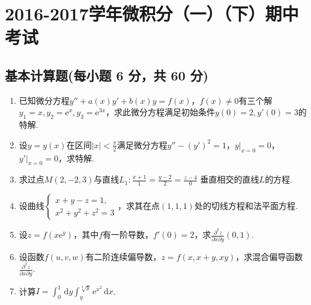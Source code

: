 \documentclass[../main.tex]{subfiles}
\begin{document}
\chapter{2016-2017学年微积分（一）（下）期中考试}

\section{基本计算题(每小题 6 分，共 60 分)}
\begin{enumerate}
    \item 已知微分方程$y''+a(x)y'+b(x)y=f(x)$，$f(x)\neq0$有三个解$y_{1}=x,y_{2}
              =\mathrm{e}^{x},y_{3}=\mathrm{e}^{3x}$，求此微分方程满足初始条件$y(0)=2,y'(0)
              =3$的特解.
          \vspace{11em}

    \item 设$y=y(x)$在区间$|x|<\frac{\pi}{2}$满足微分方程$y''-(y')^{2}=1$，$y|_{x=0}
              =0$，$y'|_{x=0}=0$，求特解.
          \vspace{11em}

    \item 求过点$M(2,-2,3)$与直线$L_{1}:\frac{x+1}{1}=\frac{y-2}{2}=\frac{z-4}{0}$
          垂直相交的直线$L$的方程.
          \vspace{12em}

    \item 设曲线$\begin{cases}
                  x+y-z=1, \\
                  x^{2}+y^{2}+z^{2}=3
              \end{cases}$，求其在点$(1,1,1)$处的切线方程和法平面方程.
          \vspace{12em}

    \item 设$z=f(x\mathrm{e}^{y})$，其中$f$有一阶导数，$f'(0)=2$，求$\frac{\partial^{2}
                  z}{\partial x\partial y}(0,1)$.
          \vspace{12em}

    \item 设函数$f(u,v,w)$有二阶连续偏导数，$z=f(x,x+y,xy)$，求混合偏导函数$\frac{\partial^{2}
                  z}{\partial x\partial y}$.
          \vspace{12em}

    \item 计算$I=\int_{0}^{1}\,\mathrm{d}y\int_{y}^{\sqrt[3]{y}}\mathrm{e}^{x^{2}}\,\mathrm{d}x$.
          \vspace{12em}


\end{enumerate}
\end{document}
